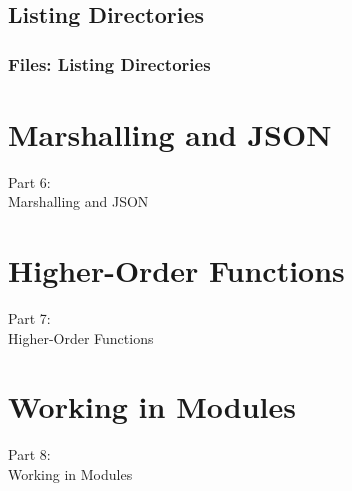 \subsection{Listing Directories}
\contentListdir{
\begin{verbatim}

\end{verbatim}
}
\begin{frame}
    \frametitle{\textbf{Files:} Listing Directories}
    \vspace{0mm}
    \contentListdir
\end{frame}


\section{Marshalling and JSON}
\begin{frame}
    \vspace{25mm}
    \begin{center}
        \Huge{Part 6:\\Marshalling and JSON}
    \end{center}
\end{frame}


\section{Higher-Order Functions}
\begin{frame}
    \vspace{25mm}
    \begin{center}
        \Huge{Part 7:\\Higher-Order Functions}
    \end{center}
\end{frame}


\section{Working in Modules}
\begin{frame}
    \vspace{25mm}
    \begin{center}
        \Huge{Part 8:\\Working in Modules}
    \end{center}
\end{frame}

